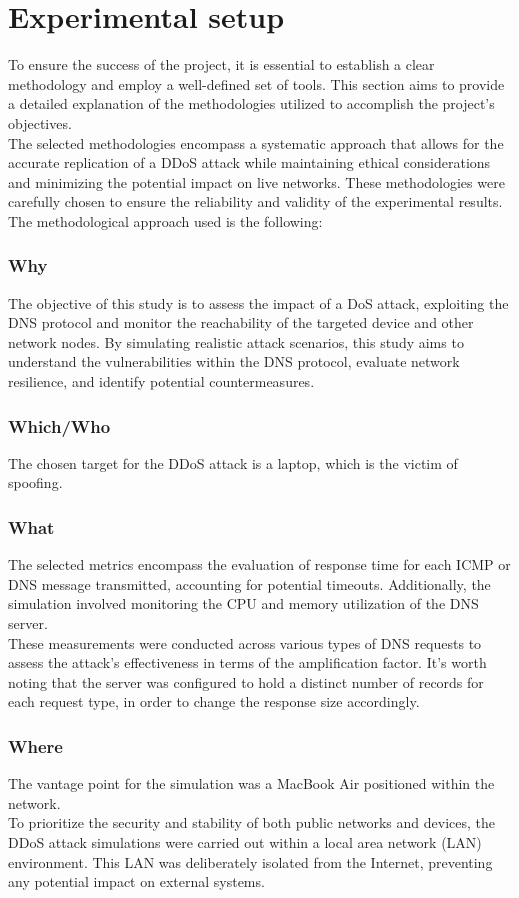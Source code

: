 \section{Experimental setup}

To ensure the success of the project, it is essential to establish a clear methodology and employ a well-defined set of tools.
This section aims to provide a detailed explanation of the methodologies utilized to accomplish the project's objectives.\\
The selected methodologies encompass a systematic approach that allows for the accurate replication of a
DDoS attack while maintaining ethical considerations and minimizing the potential impact on live networks.
These methodologies were carefully chosen to ensure the reliability and validity of the experimental results.
The methodological approach used is the following:

\subsubsection*{Why}
The objective of this study is to assess the impact of a DoS attack, exploiting the DNS protocol and monitor the reachability
of the targeted device and other network nodes.
By simulating realistic attack scenarios, this study aims to understand the vulnerabilities within the DNS protocol, evaluate network resilience,
and identify potential countermeasures.

\subsubsection*{Which/Who}
The chosen target for the DDoS attack is a laptop, which is the victim of spoofing.

\subsubsection*{What}
The selected metrics encompass the evaluation of response time for each ICMP or DNS message transmitted, accounting for potential timeouts.
Additionally, the simulation involved monitoring the CPU and memory utilization of the DNS server.\\
These measurements were conducted across various types of DNS requests to assess the attack's effectiveness in terms of the amplification factor.
It's worth noting that the server was configured to hold a distinct number of records for each request type, in order to change the response size accordingly.

\subsubsection*{Where}
The vantage point for the simulation was a MacBook Air positioned within the network.\\
To prioritize the security and stability of both public networks and devices,
the DDoS attack simulations were carried out within a local area network (LAN) environment.
This LAN was deliberately isolated from the Internet, preventing any potential impact on external systems.\\
